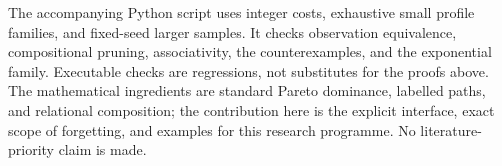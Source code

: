 \documentclass[11pt]{article}
\begin{document}
The accompanying Python script uses integer costs, exhaustive small profile families, and fixed-seed larger samples. It checks observation equivalence, compositional pruning, associativity, the counterexamples, and the exponential family. Executable checks are regressions, not substitutes for the proofs above. The mathematical ingredients are standard Pareto dominance, labelled paths, and relational composition; the contribution here is the explicit interface, exact scope of forgetting, and examples for this research programme. No literature-priority claim is made.
\end{document}

